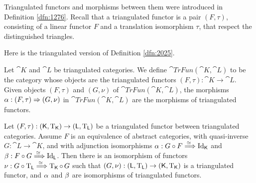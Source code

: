 Triangulated functors and morphisms between them were introduced in Definition
\ref{dfn:1276}. Recall that a triangulated functor is a pair $(F, \tau)$, 
consisting of a linear functor $F$ and a translation isomorphism $\tau$, 
that respect the distinguished triangles. 

Here is the triangulated version of Definition \ref{dfn:2025}. 

\begin{dfn} \label{dfn:2335}
Let $\cat{K}$ and $\cat{L}$ be triangulated categories. We define 
$\cat{TrFun}(\cat{K}, \cat{L})$
to be the category whose objects are the triangulated functors 
$(F, \tau) : \cat{K} \to \cat{L}$. Given objects 
$(F, \tau)$ and $(G, \nu)$ of $\cat{TrFun}(\cat{K}, \cat{L})$,
the morphisms 
$\alpha : (F, \tau) \Rightarrow (G, \nu)$ 
in  $\cat{TrFun}(\cat{K}, \cat{L})$
are the morphisms of triangulated functors. 
\end{dfn}

\begin{lem} \label{lem:2370}  
Let 
$(F, \tau) : (\operatorname{\mathsf{K}}, \operatorname{T}_{\operatorname{\mathsf{K}}}) \to (\operatorname{\mathsf{L}}, \operatorname{T}_{\operatorname{\mathsf{L}}})$
be a triangulated functor between 
triangulated categories. Assume $F$ is an equivalence \tup{(}of 
abstract categories\tup{)}, with quasi-inverse 
$G : \cat{L} \to \cat{K}$, and with adjunction isomorphisms 
$\alpha : G \circ F \stackrel{\simeq\ }{\Longrightarrow} \operatorname{Id}_{\operatorname{\mathsf{K}}}$ and  
$\beta : F \circ G \stackrel{\simeq\ }{\Longrightarrow} \operatorname{Id}_{\operatorname{\mathsf{L}}}$. 
Then there is an isomorphism of functors 
$\nu : G \circ \operatorname{T}_{\operatorname{\mathsf{L}}} \stackrel{\simeq\ }{\Longrightarrow} \operatorname{T}_{\operatorname{\mathsf{K}}} \circ \, G$ 
such that 
$(G, \nu) : (\operatorname{\mathsf{L}}, \operatorname{T}_{\operatorname{\mathsf{L}}}) \to (\operatorname{\mathsf{K}}, \operatorname{T}_{\operatorname{\mathsf{K}}})$
is a triangulated functor, and $\alpha$ and $\beta$ are isomorphisms of 
triangulated functors.
\end{lem}

